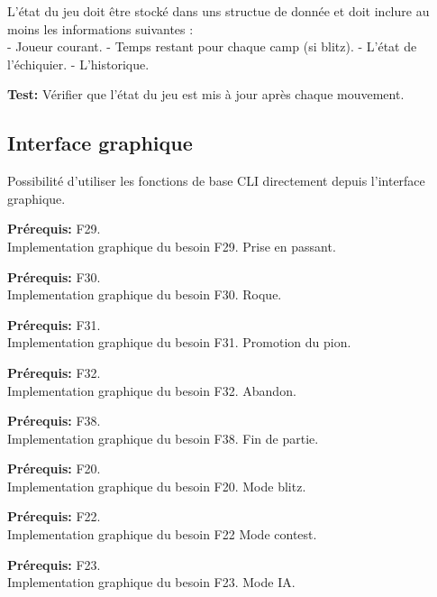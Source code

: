 \documentclass{article}
\begin{document}
\begin{needbox}
    L’état du jeu doit être stocké dans uns structue de donnée et doit inclure au moins les informations suivantes : \\
    - Joueur courant.  
    - Temps restant pour chaque camp (si blitz).  
    - L’état de l’échiquier.  
    - L’historique.

    \textbf{Test:} Vérifier que l’état du jeu est mis à jour après chaque mouvement.
\end{needbox}

\subsection{Interface graphique}

\begin{needbox}
    Possibilité d'utiliser les fonctions de base CLI directement depuis l'interface graphique.
    \begin{subneedbox}
        \textbf{Prérequis:} F29.\\
        Implementation graphique du besoin F29. Prise en passant.
    \end{subneedbox}
    \begin{subneedbox}[F46.2: Roque]
        \textbf{Prérequis:} F30.\\
        Implementation graphique du besoin F30. Roque.
    \end{subneedbox}
    \begin{subneedbox}[F46.3: Promotion]
        \textbf{Prérequis:} F31.\\
        Implementation graphique du besoin F31. Promotion du pion.
    \end{subneedbox}
    \begin{subneedbox}[F46.4: Abandon]
        \textbf{Prérequis:} F32.\\
        Implementation graphique du besoin F32. Abandon.
    \end{subneedbox}
    \begin{subneedbox}
        \textbf{Prérequis:} F38.\\
        Implementation graphique du besoin F38. Fin de partie.
    \end{subneedbox}
    \begin{subneedbox}
        \textbf{Prérequis:} F20.\\
        Implementation graphique du besoin F20. Mode blitz.
    \end{subneedbox}
    \begin{subneedbox}
        \textbf{Prérequis:} F22.\\
        Implementation graphique du besoin F22 Mode contest.
    \end{subneedbox}
    \begin{subneedbox}[F46.8: Mode IA]
        \textbf{Prérequis:} F23.\\
        Implementation graphique du besoin F23. Mode IA.
    \end{subneedbox}
    
\end{needbox}
\end{document}
